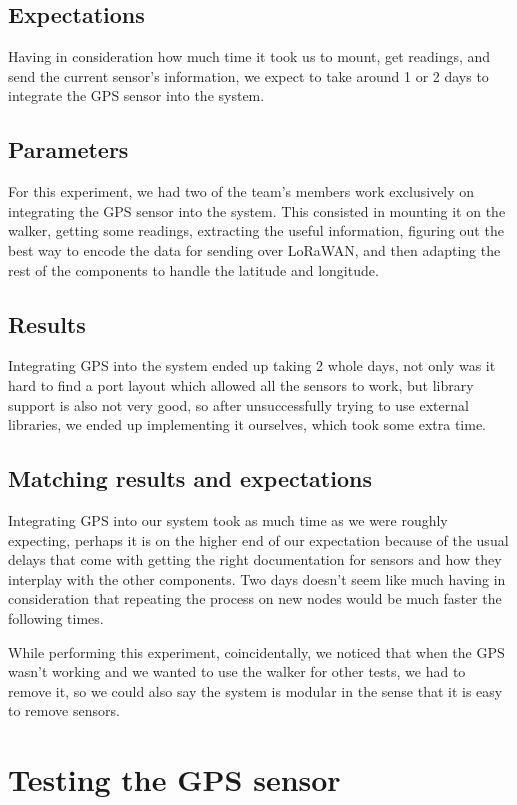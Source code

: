	\subsection{Expectations}
	Having in consideration how much time it took us to mount, get readings, and send the current sensor's information, we expect to take around 1 or 2 days to integrate the GPS sensor into the system. 

	\subsection{Parameters}
	For this experiment, we had two of the team's members work exclusively on integrating the GPS sensor into the system. This consisted in mounting it on the walker, getting some readings, extracting the useful information, figuring out the best way to encode the data for sending over LoRaWAN, and then adapting the rest of the components to handle the latitude and longitude.

	\subsection{Results}
	Integrating GPS into the system ended up taking 2 whole days, not only was it hard to find a port layout which allowed all the sensors to work, but library support is also not very good, so after unsuccessfully trying to use external libraries, we ended up implementing it ourselves, which took some extra time.

	\subsection{Matching results and expectations}
	Integrating GPS into our system took as much time as we were roughly expecting, perhaps it is on the higher end of our expectation because of the usual delays that come with getting the right documentation for sensors and how they interplay with the other components. Two days doesn't seem like much having in consideration that repeating the process on new nodes would be much faster the following times.

	While performing this experiment, coincidentally, we noticed that when the GPS wasn't working and we wanted to use the walker for other tests, we had to remove it, so we could also say the system is modular in the sense that it is easy to remove sensors.

\section{Testing the GPS sensor}

